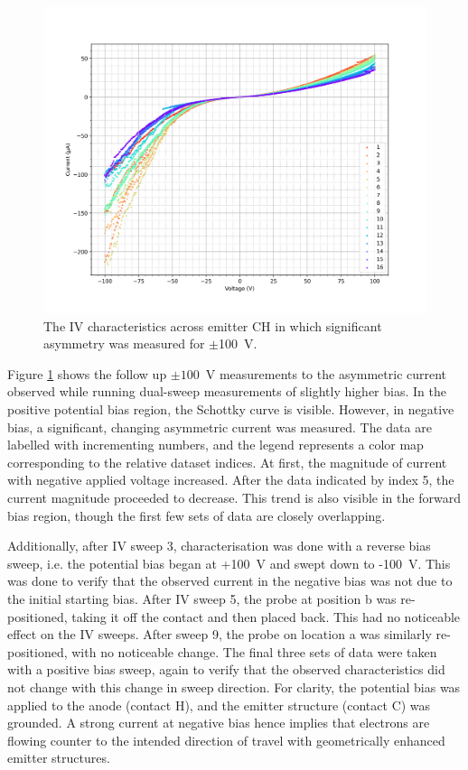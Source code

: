 \begin{refsection}
\begin{figure}[H]
    \centering
    \includegraphics[width=\linewidth]{Chapter7/Figs/Raster/Emitters/124-145_iv.png}
    \caption{The IV characteristics across emitter CH in which significant asymmetry was measured for $\pm$100~\si{\volt}.}
    \label{fig:e_ch_124-145_iv}
\end{figure}

Figure \ref{fig:e_ch_124-145_iv} shows the follow up $\pm100$~\si{\volt} measurements to the asymmetric current observed while running dual-sweep measurements of slightly higher bias. In the positive potential bias region, the Schottky curve is visible. However, in negative bias, a significant, changing asymmetric current was measured. The data are labelled with incrementing numbers, and the legend represents a color map corresponding to the relative dataset indices. At first, the magnitude of current with negative applied voltage increased. After the data indicated by index 5, the current magnitude proceeded to decrease. This trend is also visible in the forward bias region, though the first few sets of data are closely overlapping.

Additionally, after IV sweep 3, characterisation was done with a reverse bias sweep, i.e. the potential bias began at +100~\si{\volt} and swept down to -100~\si{\volt}. This was done to verify that the observed current in the negative bias was not due to the initial starting bias. After IV sweep 5, the probe at position b was re-positioned, taking it off the contact and then placed back. This had no noticeable effect on the IV sweeps. After sweep 9, the probe on location a was similarly re-positioned, with no noticeable change. The final three sets of data were taken with a positive bias sweep, again to verify that the observed characteristics did not change with this change in sweep direction. For clarity, the potential bias was applied to the anode (contact H), and the emitter structure (contact C) was grounded. A strong current at negative bias hence implies that electrons are flowing counter to the intended direction of travel with geometrically enhanced emitter structures.


\end{refsection}
